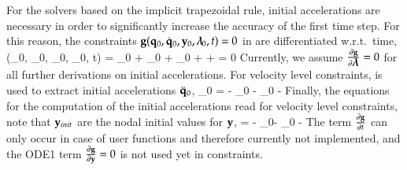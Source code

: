%
For the solvers based on the implicit trapezoidal rule, initial accelerations are necessary in order to significantly increase the accuracy
of the first time step.
For this reason, the constraints $\mathbf{g}(\mathbf{q}_0, \dot {\mathbf{q}}_0, \mathbf{y}_0, \mbox{\boldmath $\lambda$ \unboldmath}\!\!_0, t) = 0$ in  are differentiated w.r.t.\ time,
\be \label{eq_initialAccelerationsVel}
	\dot \gv(\qv_0, \dot \qv_0, \yv_0, \tlambda_0, t) = 
	\frac{\partial \gv}{\partial \qv} \dot \qv_0 + 
	\frac{\partial \gv}{\partial \dot \qv}\ddot \qv_0 +
	\frac{\partial \gv}{\partial \yv} \dot \yv_0 + 
	\frac{\partial \gv}{\partial \tlambda} \dot \tlambda +
	 = 0 \eqDot 
\ee
Currently, we assume $\frac{\partial \mathbf{g}}{\partial \mbox{\boldmath $\lambda$ \unboldmath}\!\!} = 0$ for all further derivations on initial accelerations.
For velocity level constraints,  is used to extract initial accelerations $\ddot {\mathbf{q}}_0$,
\be
  \frac{\partial \gv}{\partial \dot \qv}\ddot \qv_0 = %
	  -\frac{\partial \gv}{\partial \qv} \dot \qv_0 
		-\frac{\partial \gv}{\partial \yv} \dot \yv_0
		-	 \eqDot
\ee
%
Finally, the equations for the computation of the initial accelerations read for velocity level constraints,
note that $\mathbf{y}_{init}$ are the nodal initial values for $\mathbf{y}$,
\be \label{eq_initialAccelerationsVel2}
	   {\Null}{\Im}{\Null}
		 {\frac{\partial \gv}{\partial \dot \qv}}{\Null}{\Null}
   = 
	      {-\frac{\partial \gv}{\partial \qv} \dot \qv_0-\frac{\partial \gv}{\partial \yv} \dot \yv_0 - }  \eqComma
\ee
%
The term $\frac{\partial \mathbf{g}}{\partial t}$ can only occur in case of user functions and therefore currently not implemented, and the ODE1 term $\frac{\partial \mathbf{g}}{\partial \mathbf{y}} = 0$ is not used yet in constraints.

